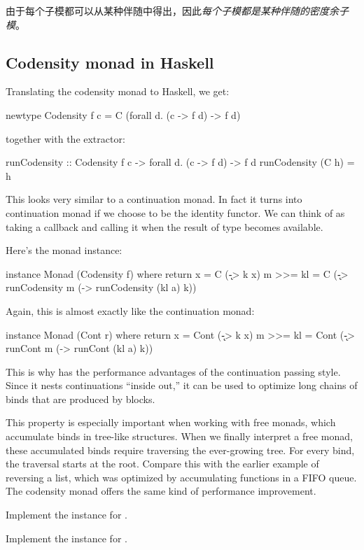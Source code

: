 \documentclass[DaoFP]{subfiles}
\begin{document}
由于每个子模都可以从某种伴随中得出，因此\emph{每个子模都是某种伴随的密度余子模}。

\subsection{Codensity monad in Haskell}

Translating the codensity monad to Haskell, we get:
 \begin{haskell}
newtype Codensity f c = C (forall d. (c -> f d) -> f d)
 \end{haskell}
 together with the extractor:
 \begin{haskell}
runCodensity :: Codensity f c -> forall d. (c -> f d) -> f d
runCodensity (C h) = h
 \end{haskell}
This looks very similar to a continuation monad. In fact it turns into continuation monad if we choose  to be the identity functor. We can think of  as taking a callback  and calling it when the result of type  becomes available. 

Here's the monad instance:
 \begin{haskell}
instance Monad (Codensity f) where
  return x = C (\k -> k x)
  m >>= kl = C (\k -> runCodensity m (\a -> runCodensity (kl a) k))
 \end{haskell}
 Again, this is almost exactly like the continuation monad:
 \begin{haskell}
instance Monad (Cont r) where
  return x = Cont (\k -> k x)
  m >>= kl = Cont (\k -> runCont m (\a -> runCont (kl a) k))
\end{haskell}
This is why  has the performance advantages of the continuation passing style. Since it nests continuations ``inside out,'' it can be used to optimize long chains of binds that are produced by  blocks. 

This property is especially important when working with free monads, which accumulate binds in tree-like structures. When we finally interpret a free monad, these accumulated binds require traversing the ever-growing tree. For every bind, the traversal starts at the root. Compare this with the earlier example of reversing a list, which was optimized by accumulating functions in a FIFO queue. The codensity monad offers the same kind of performance improvement.

\begin{exercise}
Implement the  instance for .
\end{exercise}
\begin{exercise}
Implement the  instance for .
\end{exercise}
\end{document}
